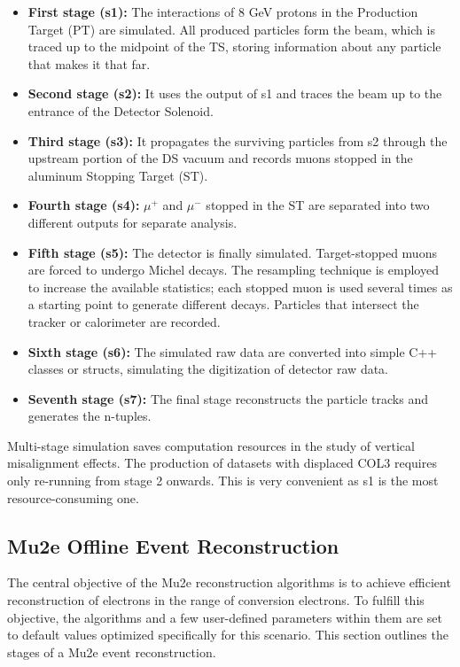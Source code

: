 \begin{itemize}
    \item \textbf{First stage (s1):} The interactions of 8 GeV protons in the Production Target (PT) are simulated. All produced particles form the beam, which is traced up to the midpoint of the TS, storing information about any particle that makes it that far.
    \item \textbf{Second stage (s2):} It uses the output of s1 and traces the beam up to the entrance of the Detector Solenoid.
    \item \textbf{Third stage (s3):} It propagates the surviving particles from s2 through the upstream portion of the DS vacuum and records muons stopped in the aluminum Stopping Target (ST).
    \item \textbf{Fourth stage (s4):} $\mu^+$ and $\mu^-$ stopped in the ST are separated into two different outputs for separate analysis.
    \item \textbf{Fifth stage (s5):} The detector is finally simulated. Target-stopped muons are forced to undergo Michel decays. The resampling technique is employed to increase the available statistics; each stopped muon is used several times as a starting point to generate different decays. Particles that intersect the tracker or calorimeter are recorded.
    \item \textbf{Sixth stage (s6):} The simulated raw data are converted into simple C++ classes or structs, simulating the digitization of detector raw data.
    \item \textbf{Seventh stage (s7):} The final stage reconstructs the particle tracks and generates the n-tuples.
\end{itemize}

Multi-stage simulation saves computation resources in the study of vertical misalignment effects. The production of datasets with displaced COL3 requires only re-running from stage 2 onwards. This is very convenient as s1 is the most resource-consuming one.

\subsection{Mu2e Offline Event Reconstruction}

The central objective of the Mu2e reconstruction algorithms is to achieve efficient reconstruction of electrons in the range of conversion electrons. To fulfill this objective, the algorithms and a few user-defined parameters within them are set to default values optimized specifically for this scenario. This section outlines the stages of a Mu2e event reconstruction.

